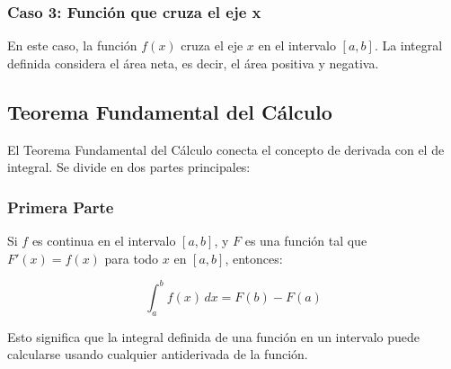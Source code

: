 \subsubsection{Caso 3: Función que cruza el eje x}

En este caso, la función \( f(x) \) cruza el eje \( x \) en el intervalo \([a, b]\). La integral definida considera el área neta, es decir, el área positiva y negativa.

\begin{center}
\end{center}

\subsection{Teorema Fundamental del Cálculo}

El Teorema Fundamental del Cálculo conecta el concepto de derivada con el de integral. Se divide en dos partes principales:

\subsubsection{Primera Parte}
Si \( f \) es continua en el intervalo \([a, b]\), y \( F \) es una función tal que \( F'(x) = f(x) \) para todo \( x \) en \([a, b]\), entonces:

\[
\int_a^b f(x) \, dx = F(b) - F(a)
\]

Esto significa que la integral definida de una función en un intervalo puede calcularse usando cualquier antiderivada de la función.

